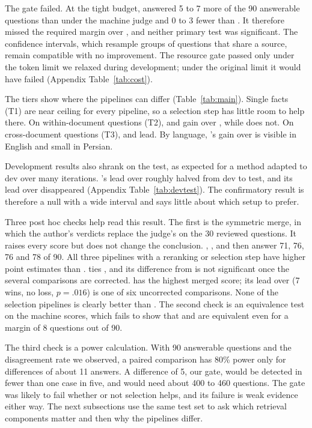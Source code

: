 The gate failed. At the tight budget, \lexb{} answered 5 to 7 more of the 90 answerable questions than \hybrid{} under the machine judge and 0 to 3 fewer than \hr. It therefore missed the required margin over \hr, and neither primary test was significant. The confidence intervals, which resample groups of questions that share a source, remain compatible with no improvement. The resource gate passed only under the token limit we relaxed during development; under the original limit it would have failed (Appendix Table~\ref{tab:cost}).

The tiers show where the pipelines can differ (Table~\ref{tab:main}). Single facts (T1) are near ceiling for every pipeline, so a selection step has little room to help there. On within-document questions (T2), \lexb{} and \hr{} gain over \hybrid, while \setr{} does not. On cross-document questions (T3), \hr{} and \setr{} lead. By language, \lexb's gain over \hybrid{} is visible in English and small in Persian.

Development results also shrank on the test, as expected for a method adapted to dev over many iterations. \lexb's lead over \hybrid{} roughly halved from dev to test, and its lead over \hr{} disappeared (Appendix Table~\ref{tab:devtest}). The confirmatory result is therefore a null with a wide interval and says little about which setup to prefer.

Three post hoc checks help read this result. The first is the symmetric merge, in which the author's verdicts replace the judge's on the 30 reviewed questions. It raises every score but does not change the conclusion. \hybrid, \hr, \lexb{} and \setr{} then answer 71, 76, 76 and 78 of 90. All three pipelines with a reranking or selection step have higher point estimates than \hybrid. \lexb{} ties \hr, and its difference from \hybrid{} is not significant once the several comparisons are corrected. \setr{} has the highest merged score; its lead over \hybrid{} (7 wins, no loss, $p=.016$) is one of six uncorrected comparisons. None of the selection pipelines is clearly better than \hr. The second check is an equivalence test on the machine scores, which fails to show that \lexb{} and \hr{} are equivalent even for a margin of 8 questions out of 90.

The third check is a power calculation. With 90 answerable questions and the disagreement rate we observed, a paired comparison has 80\% power only for differences of about 11 answers. A difference of 5, our gate, would be detected in fewer than one case in five, and would need about 400 to 460 questions. The gate was likely to fail whether or not selection helps, and its failure is weak evidence either way. The next subsections use the same test set to ask which retrieval components matter and then why the pipelines differ.
